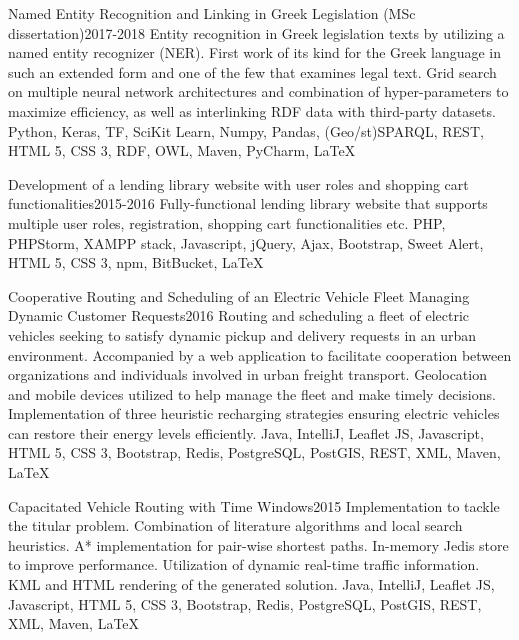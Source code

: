 \begin{projects}
	\project
	{Named Entity Recognition and Linking in Greek Legislation (MSc dissertation)}{2017-2018}
	{}
	{Entity recognition in Greek legislation texts by utilizing a named entity recognizer (NER). First work of its kind for the Greek language in such an extended form and one of the few that examines legal text. Grid search on multiple neural network architectures and combination of hyper-parameters to maximize efficiency, as well as interlinking RDF data with third-party datasets.}
	{Python, Keras, TF, SciKit Learn, Numpy, Pandas, (Geo/st)SPARQL, REST, HTML 5, CSS 3, RDF, OWL, Maven, PyCharm, \LaTeX}

	\newpage

	\project
	{Development of a lending library website with user roles and shopping cart functionalities}{2015-2016}
	{}
	{Fully-functional lending library website that supports multiple user roles, registration, shopping cart functionalities etc.}
	{PHP, PHPStorm, XAMPP stack, Javascript, jQuery, Ajax, Bootstrap, Sweet Alert, HTML 5, CSS 3, npm, BitBucket, \LaTeX}

	\project
	{Cooperative Routing and Scheduling of an Electric Vehicle Fleet Managing Dynamic Customer Requests}{2016}
	{   }
	{Routing and scheduling a fleet of electric vehicles seeking to satisfy dynamic pickup and delivery requests in an urban environment. Accompanied by a web application to facilitate cooperation between organizations and individuals involved in urban freight transport. Geolocation and mobile devices utilized to help manage the fleet and make timely decisions. Implementation of three heuristic recharging strategies ensuring electric vehicles can restore their energy levels efficiently.}
	{Java, IntelliJ, Leaflet JS, Javascript, HTML 5, CSS 3, Bootstrap, Redis, PostgreSQL, PostGIS, REST, XML, Maven, \LaTeX}

	\project
	{Capacitated Vehicle Routing with Time Windows}{2015}
	{ }
	{Implementation to tackle the titular problem. Combination of literature algorithms and local search heuristics. A* implementation for pair-wise shortest paths. In-memory Jedis store to improve performance. Utilization of dynamic real-time traffic information. KML and HTML rendering of the generated solution.}
	{Java, IntelliJ, Leaflet JS, Javascript, HTML 5, CSS 3, Bootstrap, Redis, PostgreSQL, PostGIS, REST, XML, Maven, \LaTeX}

\end{projects}